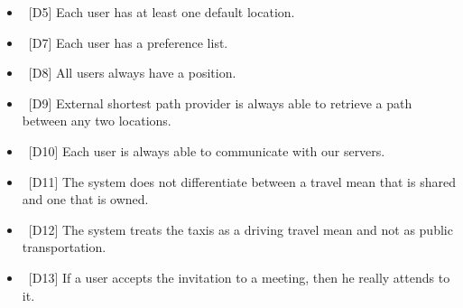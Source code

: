 \begin{description}
\begin{itemize}
\item~[D5] Each user has at least one default location.
\item~[D7] Each user has a preference list.
\item~[D8] All users always have a position.
\item~[D9] External shortest path provider is always able to retrieve a path between any two locations.
\item~[D10] Each user is always able to communicate with our servers.
\item~[D11] The system does not differentiate between a travel mean that is shared and one that is owned.
\item~[D12] The system treats the taxis as a driving travel mean and not as public transportation.
\item~[D13] If a user accepts the invitation to a meeting, then he really attends to it.
\end{itemize}
\end{description}